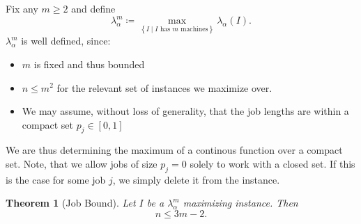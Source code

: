 \documentclass[11pt]{article}
\newtheorem{theorem}{Theorem}
\begin{document}
Fix any $m \ge 2$ and define
\[
 \lambda^{m}_{\alpha} \coloneq \max_{\left\{ I \mid I \text{ has } m \text{ machines} \right\}}\lambda_{\alpha}(I).
\]
\newline
$\lambda^{m}_{\alpha}$ is well defined, since: 
\begin{itemize}
     \item $m$ is fixed and thus bounded
     \item $n \le m^2$ for the relevant set of instances we maximize over. 
     \item We may assume, without loss of generality, that the job lengths are within a compact set $p_j \in [0,1]$
\end{itemize}
We are thus determining the maximum of a continous function over a compact set. 
Note, that we allow jobs of size \(p_j=0\) solely to work with a closed set.
If this is the case for some job $j$, we simply delete it from the instance. 

\begin{theorem}[Job Bound]\label{thm:job-bound}
Let $I$ be a $\lambda_{\alpha}^{m}$ maximizing instance.  Then
\[
  n\leq3m-2.
\]
\end{theorem}
\end{document}
